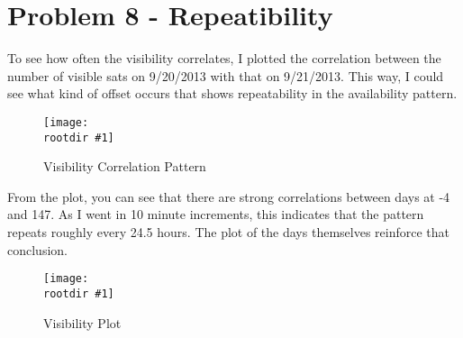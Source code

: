 \documentclass[12pt,a4paper,oneside]{article}
\newcommand{\rootdir}{./Figures/}
\newcommand{\figH}[3]{
			\begin{figure}[H]
				\centering
				\texttt{[image: \\rootdir \#1]}
				\caption{#2}
				\label{#3}
			\end{figure}
			}
\begin{document}
\section{Problem 8 - Repeatibility}
To see how often the visibility correlates, I plotted the correlation between the number of visible sats on 9/20/2013 with that on 9/21/2013. This way, I could see what kind of offset occurs that shows repeatability in the availability pattern. 
\figH{corr.eps}{Visibility Correlation Pattern}{fig:corr}
From the plot, you can see that there are strong correlations between days at -4 and 147. As I went in 10 minute increments, this indicates that the pattern repeats roughly every 24.5 hours. The plot of the days themselves reinforce that conclusion. 

\figH{corr2.eps}{Visibility Plot}{fig:corr2}
\end{document}
